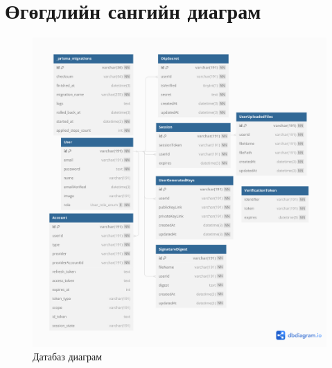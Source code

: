 \section{Өгөгдлийн сангийн диаграм}

\begin{figure}[h!]
	\centering
	\includegraphics[scale=0.5]{assets/cryptography.png}
	\caption{Датабаз диаграм}
	\label{fig:dbdiagram}
\end{figure}
\break
\newpage

